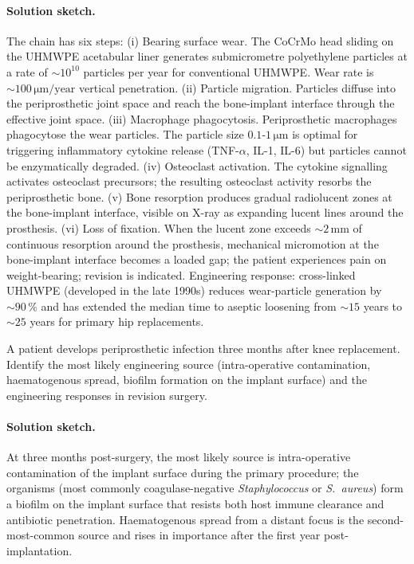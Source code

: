 \paragraph{Solution sketch.}
The chain has six steps:
(i) Bearing surface wear. The CoCrMo head sliding on the UHMWPE
acetabular liner generates submicrometre polyethylene particles at
a rate of $\sim 10^{10}$ particles per year for conventional UHMWPE.
Wear rate is $\sim 100\,\si{\micro\meter}/\text{year}$ vertical
penetration.
(ii) Particle migration. Particles diffuse into the periprosthetic
joint space and reach the bone-implant interface through the
effective joint space.
(iii) Macrophage phagocytosis. Periprosthetic macrophages phagocytose
the wear particles. The particle size $0.1$-$1\,\si{\micro\meter}$
is optimal for triggering inflammatory cytokine release (TNF-$\alpha$,
IL-1, IL-6) but particles cannot be enzymatically degraded.
(iv) Osteoclast activation. The cytokine signalling activates
osteoclast precursors; the resulting osteoclast activity resorbs
the periprosthetic bone.
(v) Bone resorption produces gradual radiolucent zones at the
bone-implant interface, visible on X-ray as expanding lucent lines
around the prosthesis.
(vi) Loss of fixation. When the lucent zone exceeds $\sim 2\,\text{mm}$
of continuous resorption around the prosthesis, mechanical
micromotion at the bone-implant interface becomes a loaded gap; the
patient experiences pain on weight-bearing; revision is indicated.
Engineering response: cross-linked UHMWPE (developed in the late
1990s) reduces wear-particle generation by $\sim 90\,\%$ and has
extended the median time to aseptic loosening from $\sim 15$ years
to $\sim 25$ years for primary hip replacements.

\begin{exercise}
A patient develops periprosthetic infection three months after knee
replacement. Identify the most likely engineering source (intra-operative
contamination, haematogenous spread, biofilm formation on the implant
surface) and the engineering responses in revision surgery.
\end{exercise}

\paragraph{Solution sketch.}
At three months post-surgery, the most likely source is
intra-operative contamination of the implant surface during the
primary procedure; the organisms (most commonly coagulase-negative
\emph{Staphylococcus} or \emph{S.\ aureus}) form a biofilm on the
implant surface that resists both host immune clearance and
antibiotic penetration. Haematogenous spread from a distant focus
is the second-most-common source and rises in importance after
the first year post-implantation.

